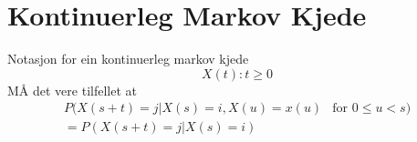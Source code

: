 \section{Kontinuerleg Markov Kjede}
Notasjon for ein kontinuerleg markov kjede
\begin{equation}
    {X(t) : t \geq 0}
\end{equation}
MÅ det vere tilfellet at
\begin{equation}
\begin{split}
    P(X(s + t) = j | X(s) = i, X(u) = x(u)  & \text{for } 0 \leq u < s) \\
    = P(X(s + t) = j | X(s) = i) &
\end{split}
\end{equation}